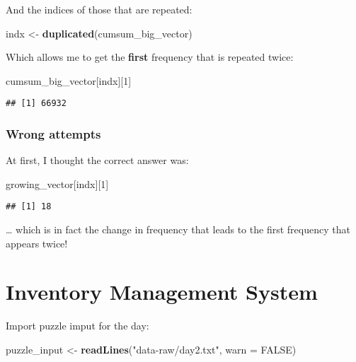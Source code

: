 \documentclass[]{book}
\newenvironment{Shaded}{\begin{snugshade}}{\end{snugshade}}
\newcommand{\KeywordTok}[1]{\textcolor[rgb]{0.13,0.29,0.53}{\textbf{#1}}}
\newcommand{\DataTypeTok}[1]{\textcolor[rgb]{0.13,0.29,0.53}{#1}}
\newcommand{\DecValTok}[1]{\textcolor[rgb]{0.00,0.00,0.81}{#1}}
\newcommand{\StringTok}[1]{\textcolor[rgb]{0.31,0.60,0.02}{#1}}
\newcommand{\OtherTok}[1]{\textcolor[rgb]{0.56,0.35,0.01}{#1}}
\newcommand{\NormalTok}[1]{#1}
\theoremstyle{definition}
\theoremstyle{definition}
\theoremstyle{definition}
\theoremstyle{remark}
\begin{document}
And the indices of those that are repeated:

\begin{Shaded}
\begin{Highlighting}[]
\NormalTok{indx <-}\StringTok{ }\KeywordTok{duplicated}\NormalTok{(cumsum_big_vector)}
\end{Highlighting}
\end{Shaded}

Which allows me to get the \textbf{first} frequency that is repeated
twice:

\begin{Shaded}
\begin{Highlighting}[]
\NormalTok{cumsum_big_vector[indx][}\DecValTok{1}\NormalTok{]}
\end{Highlighting}
\end{Shaded}

\begin{verbatim}
## [1] 66932
\end{verbatim}

\subsection{Wrong attempts}\label{wrong-attempts}

At first, I thought the correct answer was:

\begin{Shaded}
\begin{Highlighting}[]
\NormalTok{growing_vector[indx][}\DecValTok{1}\NormalTok{]}
\end{Highlighting}
\end{Shaded}

\begin{verbatim}
## [1] 18
\end{verbatim}

\ldots{} which is in fact the change in frequency that leads to the
first frequency that appears twice!

\chapter{Inventory Management System}\label{day2}

Import puzzle imput for the day:

\begin{Shaded}
\begin{Highlighting}[]
\NormalTok{puzzle_input <-}\StringTok{ }\KeywordTok{readLines}\NormalTok{(}\StringTok{"data-raw/day2.txt"}\NormalTok{, }\DataTypeTok{warn =} \OtherTok{FALSE}\NormalTok{)}
\end{Highlighting}
\end{Shaded}
\end{document}
